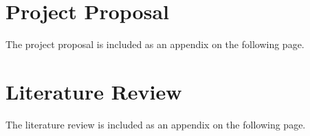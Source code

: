 \documentclass[12pt]{report}
\begin{document}
\begin{appendices}
\chapter{Project Proposal} \label{sec:proposal}
The project proposal is included as an appendix on the following page.




\begin{landscape}
    
\end{landscape}

\chapter{Literature Review} \label{sec:litreview}
The literature review is included as an appendix on the following page.



\end{appendices}
\end{document}
